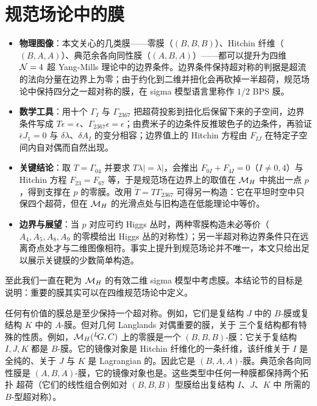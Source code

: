 
\section{规范场论中的膜}
\label{sec:zapendix}

\begin{keytakeaways}
\begin{itemize}[leftmargin=1.4em,itemsep=2pt,topsep=2pt]
\item \textbf{物理图像}：本文关心的几类膜——零膜（$(B,B,B)$）、Hitchin 纤维（$(B,A,A)$）、典范余各向同性膜（$(A,B,A)$）——都可以提升为四维 ${{\mathcal{N}}}=4$ 超 Yang-Mills 理论中的边界条件。边界条件保持超对称的判据是超流的法向分量在边界上为零；由于约化到二维并扭化会再砍掉一半超荷，规范场论中保持四分之一超对称的膜，在 sigma 模型语言里称作 $1/2$ BPS 膜。
\item \textbf{数学工具}：用十个 $\Gamma_I$ 与 $\Gamma_{2367}$ 把超荷投影到扭化后保留下来的子空间，边界条件写成 $T\epsilon=\epsilon$、$\Gamma_{2367}\epsilon=\epsilon$；由费米子的边条件反推玻色子的边条件，再验证 $\bar\epsilon J_1=0$ 与 $\delta\lambda$、$\delta A_I$ 的变分相容；边界值上的 Hitchin 方程由 $F_{IJ}$ 在特定子空间内自对偶而自然出现。
\item \textbf{关键结论}：取 $T=\Gamma_{04}$ 并要求 $T\lambda\vert=\lambda\vert$，会推出 $F_{0I}+F_{4I}=0$（$I\neq0,4$）与 Hitchin 方程 $F_{23}=F_{67}$ 等，于是规范场在边界上的取值在 ${{{\mathcal{M}}}_H}$ 中挑出一点 $p$，得到支撑在 $p$ 的零膜。改用 $\tilde T=T\Gamma_{2367}$ 可得另一构造：它在平坦时空中只保四个超荷，但在 ${{{\mathcal{M}}}_H}$ 的光滑点处与旧构造在低能理论中等价。
\item \textbf{边界与展望}：当 $p$ 对应可约 Higgs 丛时，两种零膜构造未必等价（$A_4,A_5,A_8,A_9$ 的零模给出 Higgs 丛的对称性）；另一半超对称边界条件只在远离奇点处才与二维图像相符。事实上提升到规范场论并不唯一，本文只给出足以展示关键膜的少数简单构造。
\end{itemize}
\end{keytakeaways}

至此我们一直在靶为 ${{{\mathcal{M}}}_H}$ 的有效二维 sigma 模型中考虑膜。本结论节的目标是
说明：重要的膜其实可以在四维规范场论中定义。

任何有价值的膜总是至少保持一个超对称。例如，它们是复结构 $J$ 中的
$B$-膜或复结构 $K$ 中的 $A$-膜。但对几何 Langlands 对偶重要的膜，关于
三个复结构都有特殊的性质。例如，${{{\mathcal{M}}}_H}({^L\negthinspace G},C)$ 上的零膜是一个
$(B,B,B)$-膜：它关于复结构 $I,J,K$ 都是 $B$-膜。它的镜像对象是
Hitchin 纤维化的一条纤维，该纤维关于 $I$ 是全纯的、关于 $J$ 与 $K$ 是
Lagrangian 的。因此它是 $(B,A,A)$-膜。典范余各向同性膜是
$(A,B,A)$-膜，它的镜像对象也是。这些类型中任何一种膜都保持两个拓扑
超荷（它们的线性组合例如对 $(B,B,B)$ 型膜给出复结构 $I$、$J$、$K$ 中
所需的 $B$-型超对称）。

